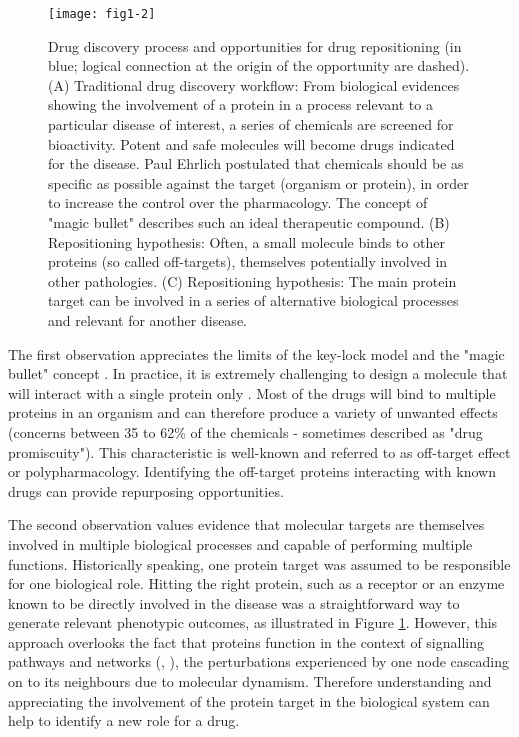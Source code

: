\begin{figure}[ht]
    \centering
    \texttt{[image: fig1-2]}
    \caption{Drug discovery process and opportunities for drug repositioning (in blue; logical connection at the origin of the opportunity are dashed). (A) Traditional drug discovery workflow: From biological evidences showing the involvement of a protein in a process relevant to a particular disease of interest, a series of chemicals are screened for bioactivity. Potent and safe molecules will become drugs indicated for the disease. Paul Ehrlich postulated that chemicals should be as specific as possible against the target (organism or protein), in order to increase the control over the pharmacology. The concept of "magic bullet" describes such an ideal therapeutic compound. (B) Repositioning hypothesis: Often, a small molecule binds to other proteins (so called off-targets), themselves potentially involved in other pathologies. (C) Repositioning hypothesis: The main protein target can be involved in a series of alternative biological processes and relevant for another disease.}
    \label{fig1-2}
\end{figure}

The first observation appreciates the limits of the key-lock model and the "magic bullet" concept \citep{ehrlichwiki}. In practice, it is extremely challenging to design a molecule that will interact with a single protein only \citep{paolini2006global} \citep{li2010pubchem}. Most of the drugs will bind to multiple proteins in an organism and can therefore produce a variety of unwanted effects (concerns between 35 to 62\% of the chemicals - sometimes described as "drug promiscuity"). This characteristic is well-known and referred to as off-target effect or polypharmacology. Identifying the off-target proteins interacting with known drugs can provide repurposing opportunities.

The second observation values evidence that molecular targets are themselves involved in multiple biological processes and capable of performing multiple functions. Historically speaking, one protein target was assumed to be responsible for one biological role. Hitting the right protein, such as a receptor or an enzyme known to be directly involved in the disease was a straightforward way to generate relevant phenotypic outcomes, as illustrated in Figure \ref{fig1-2}. However, this approach overlooks the fact that proteins function in the context of signalling pathways and networks (\cite{hopkins2008network}, \cite{barabasi2004network}), the perturbations experienced by one node cascading on to its neighbours due to molecular dynamism. Therefore understanding and appreciating the involvement of the protein target in the biological system can help to identify a new role for a drug.

